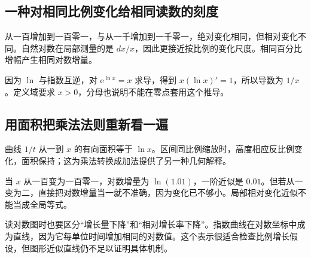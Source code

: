 \subsection*{一种对相同比例变化给相同读数的刻度}
从一百增加到一百零一，与从一千增加到一千零一，绝对变化相同，但相对变化不同。自然对数在局部测量的是 $dx/x$，因此更接近按比例的变化尺度。相同百分比增幅产生相同对数增量。

因为 $\ln$ 与指数互逆，对 $\mathrm e^{\ln x}=x$ 求导，得到 $x(\ln x)'=1$，所以导数为 $1/x$。定义域要求 $x>0$，分母也说明不能在零点套用这个推导。

\subsection*{用面积把乘法法则重新看一遍}
曲线 $1/t$ 从一到 $x$ 的有向面积等于 $\ln x$。区间同比例缩放时，高度相应反比例变化，面积保持；这为乘法转换成加法提供了另一种几何解释。

当 $x$ 从一百变为一百零一，对数增量为 $\ln(1.01)$，一阶近似是 $0.01$。但若从一变为二，直接把对数增量当一就不准确，因为变化已不够小。局部相对变化近似不能当成全局等式。

读对数图时也要区分“增长量下降”和“相对增长率下降”。指数曲线在对数坐标中成为直线，因为它每单位时间增加相同的对数值。这个表示很适合检查比例增长假设，但图形近似直线仍不足以证明具体机制。
